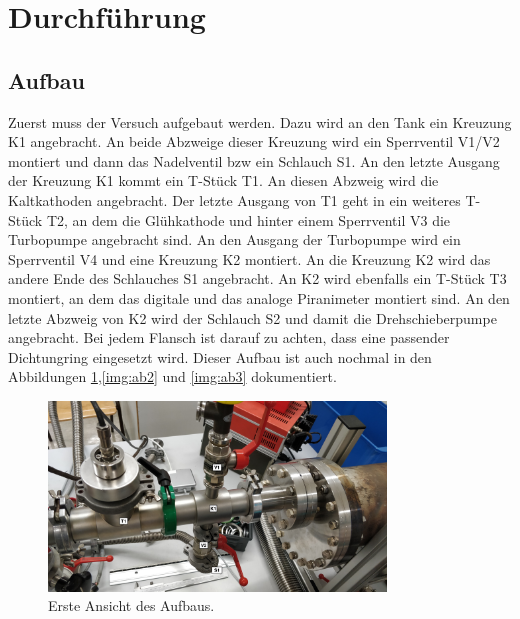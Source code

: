 \section{Durchführung}
\label{sec:Durchführung}
\subsection{Aufbau}
Zuerst muss der Versuch aufgebaut werden. Dazu wird an den Tank ein Kreuzung K1 angebracht. An beide Abzweige dieser Kreuzung wird ein Sperrventil V1/V2
montiert und dann das Nadelventil bzw ein Schlauch S1. An den letzte Ausgang der Kreuzung K1 kommt ein T-Stück T1. An diesen Abzweig wird die Kaltkathoden
angebracht. Der letzte Ausgang von T1 geht in ein weiteres T-Stück T2, an dem die Glühkathode und hinter einem Sperrventil V3 die Turbopumpe angebracht sind.
An den Ausgang der Turbopumpe wird ein Sperrventil V4 und eine Kreuzung K2 montiert. An die Kreuzung K2 wird das andere Ende des Schlauches S1 angebracht. An K2
wird ebenfalls ein T-Stück T3 montiert, an dem das digitale und das analoge Piranimeter montiert sind. An den letzte Abzweig von K2 wird der Schlauch S2 und
damit die Drehschieberpumpe angebracht. Bei jedem Flansch ist darauf zu achten, dass eine passender Dichtungring eingesetzt wird. Dieser Aufbau ist auch
nochmal in den Abbildungen \ref{img:ab1},\ref{img:ab2} und \ref{img:ab3} dokumentiert.
\begin{figure}
	\centering
	\includegraphics[width=0.8\textwidth]{img/Aufbau1.jpg}
	\caption{Erste Ansicht des Aufbaus.}
	\label{img:ab1}
\end{figure}
